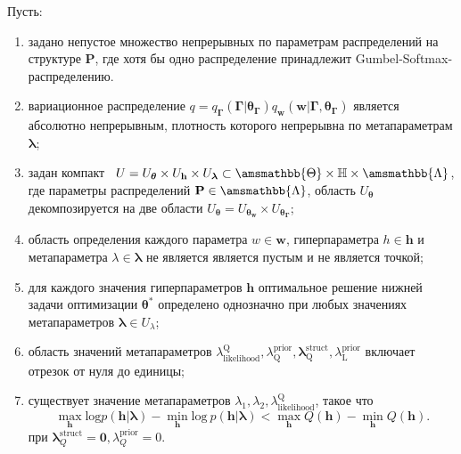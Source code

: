 \begin{theorem}
Пусть:
\begin{enumerate}[label={\arabic*)}] 
\item задано непустое множество непрерывных по параметрам распределений на структуре $\mathbf{P}$, где хотя бы одно распределение принадлежит Gumbel-Softmax-распределению.

\item вариационное распределение $q = q_{\boldsymbol{\Gamma}}(\boldsymbol{\Gamma}|\boldsymbol{\theta}_{\boldsymbol{\Gamma}}) q_{\mathbf{w}}(\mathbf{w}| \boldsymbol{\Gamma},\boldsymbol{\theta}_{\boldsymbol{\Gamma}})$ является  абсолютно непрерывным, плотность которого непрерывна по метапараметрам $\boldsymbol{\lambda}$;

\item задан компакт  $U = U_{\boldsymbol{\theta}} \times U_{\mathbf{h}} \times U_{\boldsymbol{\lambda}} \subset \amsmathbb{\Theta} \times \mathbb{H} \times \amsmathbb{\Lambda}$, где параметры распределений $\mathbf{P} \in \amsmathbb{\Lambda}$, область $U_{\boldsymbol{\theta}}$ декомпозируется на две области $U_{\boldsymbol{\theta}} = U_{\boldsymbol{\theta}_{\mathbf{w}}} \times U_{\boldsymbol{\theta}_{\boldsymbol{\Gamma}}}$;

\item область определения каждого параметра $w \in \mathbf{w}$, гиперпараметра $h \in \mathbf{h}$ и метапараметра $\lambda \in \boldsymbol{\lambda}$ не является является пустым и не является точкой;

\item для каждого значения гиперпараметров $\mathbf{h}$ оптимальное решение нижней задачи оптимизации $\boldsymbol{\theta}^{*}$ определено однозначно при любых значениях метапараметров $\boldsymbol{\lambda} \in U_{\lambda}$;

\item область значений метапараметров $\lambda_\text{likelihood}^\text{Q}, \lambda^\text{prior}_\text{Q}, \boldsymbol{\lambda}^\text{struct}_\text{Q}, \lambda^\text{prior}_\text{L}$ включает отрезок от нуля до единицы;

\item существует значение метапараметров $\lambda_1, \lambda_2, \lambda_\text{likelihood}^\text{Q}$, такое что
\[
\max_{\mathbf{h}} \text{log} p (\mathbf{h}|\boldsymbol{\lambda})-\min_{\mathbf{h}} \text{log}~p(\mathbf{h}|\boldsymbol{\lambda}) < \max_{\mathbf{h}} Q(\mathbf{h}) -  \min_{\mathbf{h}} Q(\mathbf{h}).
\] 
при $\boldsymbol{\lambda}^\text{struct}_Q = \mathbf{0}, \lambda^\text{prior}_Q = 0$.


\end{enumerate}
\end{theorem}
